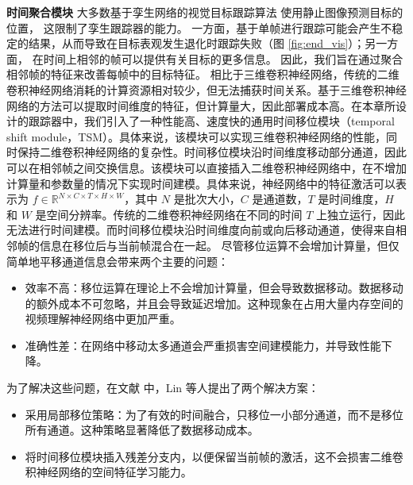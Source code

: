 \textbf{时间聚合模块}
大多数基于孪生网络的视觉目标跟踪算法 \cite{SiamRPN++, Wang2018SiamMask} 使用静止图像预测目标的位置，%
这限制了孪生跟踪器的能力。
一方面，基于单帧进行跟踪可能会产生不稳定的结果，从而导致在目标表观发生退化时跟踪失败（图 \ref{fig:end_vis}）；另一方面，
在时间上相邻的帧可以提供有关目标的更多信息。
因此，我们旨在通过聚合相邻帧的特征来改善每帧中的目标特征。
相比于三维卷积神经网络，传统的二维卷积神经网络消耗的计算资源相对较少，但无法捕获时间关系。基于三维卷积神经网络的方法可以提取时间维度的特征，但计算量大，因此部署成本高。在本章所设计的跟踪器中，我们引入了一种性能高、速度快的通用时间移位模块（temporal shift module，TSM）\cite{lin2019tsm}。具体来说，该模块可以实现三维卷积神经网络的性能，同时保持二维卷积神经网络的复杂性。时间移位模块沿时间维度移动部分通道，因此可以在相邻帧之间交换信息。该模块可以直接插入二维卷积神经网络中，在不增加计算量和参数量的情况下实现时间建模。具体来说，神经网络中的特征激活可以表示为 $f \in \mathbb R^{N\times C\times T\times H\times W}$，其中 $N$ 是批次大小，$C$ 是通道数，$T$ 是时间维度，$H$ 和 $W$ 是空间分辨率。传统的二维卷积神经网络在不同的时间 $T$ 上独立运行，因此无法进行时间建模。而时间移位模块沿时间维度向前或向后移动通道，使得来自相邻帧的信息在移位后与当前帧混合在一起。
尽管移位运算不会增加计算量，但仅简单地平移通道信息会带来两个主要的问题：
\begin{itemize}
\item 效率不高：移位运算在理论上不会增加计算量，但会导致数据移动。数据移动的额外成本不可忽略，并且会导致延迟增加。这种现象在占用大量内存空间的视频理解神经网络中更加严重。
\item 准确性差：在网络中移动太多通道会严重损害空间建模能力，并导致性能下降。
\end{itemize}

为了解决这些问题，在文献 \cite{lin2019tsm} 中，Lin 等人提出了两个解决方案：
\begin{itemize}
\item 采用局部移位策略：为了有效的时间融合，只移位一小部分通道，而不是移位所有通道。这种策略显著降低了数据移动成本。
\item 将时间移位模块插入残差分支内，以便保留当前帧的激活，这不会损害二维卷积神经网络的空间特征学习能力。
\end{itemize}

